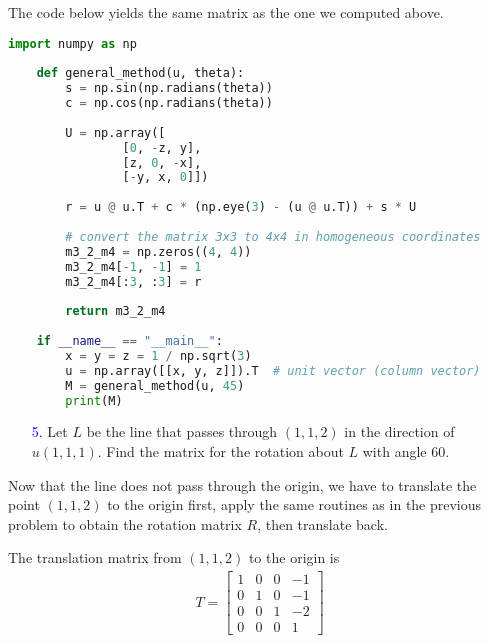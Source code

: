 \documentclass[11pt]{article}  %
\begin{document}
    The code below yields the same matrix as the one we computed above.\\
    \begin{lstlisting}[language=python,numbers=none]
    import numpy as np
    
    def general_method(u, theta):
        s = np.sin(np.radians(theta))
        c = np.cos(np.radians(theta))
    
        U = np.array([
                [0, -z, y],
                [z, 0, -x],
                [-y, x, 0]])
    
        r = u @ u.T + c * (np.eye(3) - (u @ u.T)) + s * U
    
        # convert the matrix 3x3 to 4x4 in homogeneous coordinates
        m3_2_m4 = np.zeros((4, 4))
        m3_2_m4[-1, -1] = 1
        m3_2_m4[:3, :3] = r
    
        return m3_2_m4
    
    if __name__ == "__main__":
        x = y = z = 1 / np.sqrt(3)
        u = np.array([[x, y, z]]).T  # unit vector (column vector)
        M = general_method(u, 45)
        print(M)
    \end{lstlisting}

    \begin{enumerate}[leftmargin=*]
        \item[\textcolor{blue}{5.}] Let $L$ be the line that passes through $(1,1,2)$ in the direction of $u(1,1,1)$. Find the matrix for the rotation about $L$ with angle 60\textdegree.
    \end{enumerate}
    
    \solution
    
    Now that the line does not pass through the origin, we have to translate the point $(1,1,2)$ to the origin first, apply the same routines as in the previous problem to obtain the rotation matrix $R$, then translate back.\vspace{2mm}
    
    The translation matrix from $(1,1,2)$ to the origin is
    \begin{align*}
        T=\begin{bmatrix}
            1 & 0 & 0 & -1\\
            0 & 1 & 0 & -1\\
            0 & 0 & 1 & -2\\
            0 & 0 & 0 & 1
        \end{bmatrix}
    \end{align*}
    
\end{document}
